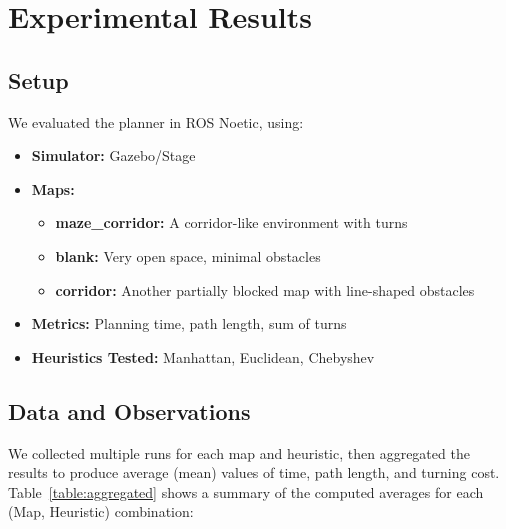 \documentclass[letterpaper, 10 pt, conference]{ieeeconf}
\begin{document}
\section{Experimental Results}\label{sec:experiments}
\subsection{Setup}
We evaluated the planner in ROS Noetic, using:
\begin{itemize}
    \item \textbf{Simulator:} Gazebo/Stage
    \item \textbf{Maps:} 
        \begin{itemize}
            \item \textbf{maze\_corridor:} A corridor-like environment with turns
            \item \textbf{blank:} Very open space, minimal obstacles
            \item \textbf{corridor:} Another partially blocked map with line-shaped obstacles
        \end{itemize}
    \item \textbf{Metrics:} Planning time, path length, sum of turns
    \item \textbf{Heuristics Tested:} Manhattan, Euclidean, Chebyshev
\end{itemize}

\subsection{Data and Observations}
We collected multiple runs for each map and heuristic, then aggregated the results to produce average (mean) values of time, path length, and turning cost. Table~\ref{table:aggregated} shows a summary of the computed averages for each (Map, Heuristic) combination:
\end{document}

